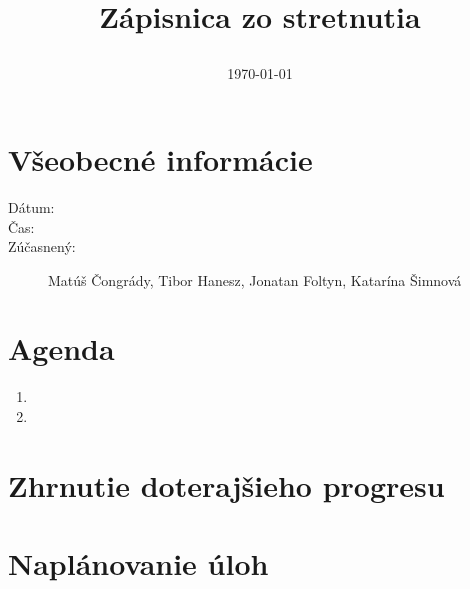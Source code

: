 \documentclass[11pt]{article}
\begin{document}
	\title{Zápisnica zo stretnutia
		\author{
			\date{\today}
		}}
		\maketitle
		
		\section{Všeobecné informácie}
		\begin{description}
			\item[Dátum:] 
			\item[Čas:] 
			\item[Zúčasnený:] Matúš Čongrády, Tibor Hanesz, Jonatan Foltyn, Katarína Šimnová
		\end{description}
		
		\section{Agenda}
		\begin{enumerate}
			\item 
			\item 
		\end{enumerate}
		
		\section{Zhrnutie doterajšieho progresu}
			\par
	
		
		\section{Naplánovanie úloh}
			\par
		
		
	
\end{document}
